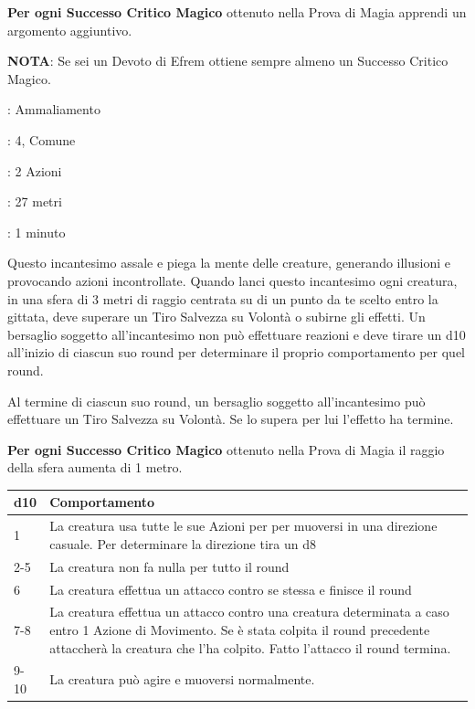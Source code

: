 \begin{multicols}{2}
\textbf{Per ogni Successo Critico Magico} ottenuto nella Prova di Magia apprendi un argomento aggiuntivo.

\textbf{NOTA}: Se sei un Devoto di Efrem ottiene sempre almeno un Successo Critico Magico.

\hypertarget{incconfusione}{}\label{incconfusione}
\noindent
\begin{description}[noitemsep, topsep=0pt, parsep=0pt, partopsep=0pt, leftmargin=0cm, labelwidth=1.3cm]
	\item[\textbf{Lista}]: Ammaliamento
	\item[\textbf{Livello}]: 4, Comune
	\item[\textbf{Lancio}]: 2 Azioni
	\item[\textbf{Gittata}]: 27 metri
	\item[\textbf{Durata}]: 1 minuto
\end{description}

Questo incantesimo assale e piega la mente delle creature, generando illusioni e provocando azioni incontrollate. Quando lanci questo incantesimo ogni creatura, in una sfera di 3 metri di raggio centrata su di un punto da te scelto entro la gittata, deve superare un Tiro Salvezza su Volontà o subirne gli effetti. Un bersaglio soggetto all'incantesimo non può effettuare reazioni e deve tirare un d10 all'inizio di ciascun suo round per determinare il proprio comportamento per quel round.

Al termine di ciascun suo round, un bersaglio soggetto all'incantesimo può effettuare un Tiro Salvezza su Volontà. Se lo supera per lui l'effetto ha termine.

\textbf{Per ogni Successo Critico Magico} ottenuto nella Prova di Magia il raggio della sfera aumenta di 1 metro.

\medskip

\noindent\begin{tabularx}{\linewidth}{lX}
	\toprule
 \rowcolor{gray!20}d10 & Comportamento\\
	\toprule
	1 & La creatura usa tutte le sue Azioni per per muoversi in una direzione casuale. Per determinare la direzione tira un d8\\
 \rowcolor{gray!20}2-5 & La creatura non fa nulla per tutto il round\\
	6 & La creatura effettua un attacco contro se stessa e finisce il round\\
 \rowcolor{gray!20}7-8 & La creatura effettua un attacco contro una creatura determinata a caso entro 1 Azione di Movimento. Se è stata colpita il round precedente attaccherà la creatura che l'ha colpito. Fatto l'attacco il round termina.\\
	9-10 & La creatura può agire e muoversi normalmente.
\end{tabularx}


\end{multicols}
